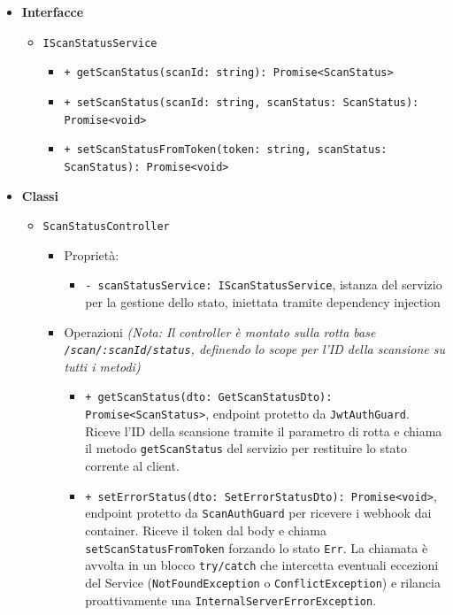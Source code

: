 \documentclass[a4paper, 11pt]{article}
\begin{document}
\begin{itemize}
  \item \textbf{Interfacce}
    \begin{itemize}
      \item \texttt{IScanStatusService}
        \begin{itemize}
          \item \texttt{+ getScanStatus(scanId: string): Promise<ScanStatus>}
          \item \texttt{+ setScanStatus(scanId: string, scanStatus: ScanStatus): Promise<void>}
          \item \texttt{+ setScanStatusFromToken(token: string, scanStatus: ScanStatus): Promise<void>}
        \end{itemize}
    \end{itemize}
  \item \textbf{Classi}
    \begin{itemize}
      \item \texttt{ScanStatusController}
        \begin{itemize}
          \item Proprietà:
            \begin{itemize}
              \item \texttt{- scanStatusService: IScanStatusService}, istanza del servizio per la gestione dello stato, iniettata tramite dependency injection
            \end{itemize}
          \item Operazioni \textit{(Nota: Il controller è montato sulla rotta base \texttt{/scan/:scanId/status}, definendo lo scope per l'ID della scansione su tutti i metodi)}
            \begin{itemize}
              \item \texttt{+ getScanStatus(dto: GetScanStatusDto): Promise<ScanStatus>}, endpoint protetto da \texttt{JwtAuthGuard}. Riceve l'ID della scansione tramite il parametro di rotta e chiama il metodo \texttt{getScanStatus} del servizio per restituire lo stato corrente al client.
              \item \texttt{+ setErrorStatus(dto: SetErrorStatusDto): Promise<void>}, endpoint protetto da \texttt{ScanAuthGuard} per ricevere i webhook dai container. Riceve il token dal body e chiama \texttt{setScanStatusFromToken} forzando lo stato \texttt{Err}. La chiamata è avvolta in un blocco \texttt{try/catch} che intercetta eventuali eccezioni del Service (\texttt{NotFoundException} o \texttt{ConflictException}) e rilancia proattivamente una \texttt{InternalServerErrorException}.
            \end{itemize}
        \end{itemize}
      

\end{itemize}
\end{itemize}
\end{document}
